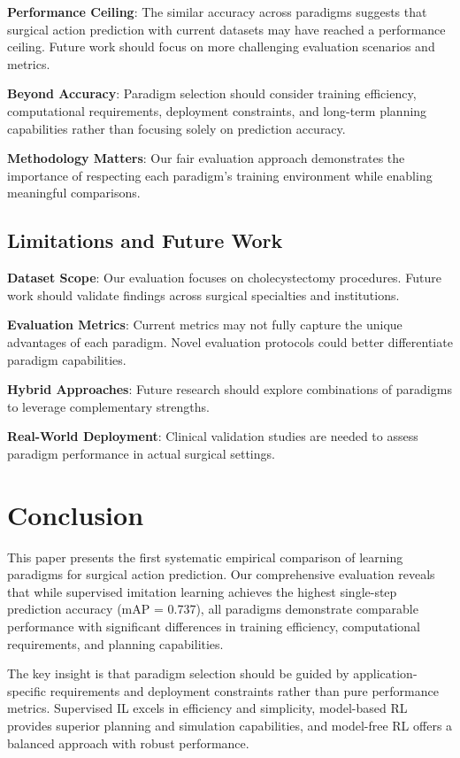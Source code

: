\documentclass[conference]{IEEEtran}
\begin{document}
\textbf{Performance Ceiling}: The similar accuracy across paradigms suggests that surgical action prediction with current datasets may have reached a performance ceiling. Future work should focus on more challenging evaluation scenarios and metrics.

\textbf{Beyond Accuracy}: Paradigm selection should consider training efficiency, computational requirements, deployment constraints, and long-term planning capabilities rather than focusing solely on prediction accuracy.

\textbf{Methodology Matters}: Our fair evaluation approach demonstrates the importance of respecting each paradigm's training environment while enabling meaningful comparisons.

\subsection{Limitations and Future Work}

\textbf{Dataset Scope}: Our evaluation focuses on cholecystectomy procedures. Future work should validate findings across surgical specialties and institutions.

\textbf{Evaluation Metrics}: Current metrics may not fully capture the unique advantages of each paradigm. Novel evaluation protocols could better differentiate paradigm capabilities.

\textbf{Hybrid Approaches}: Future research should explore combinations of paradigms to leverage complementary strengths.

\textbf{Real-World Deployment}: Clinical validation studies are needed to assess paradigm performance in actual surgical settings.

\section{Conclusion}

This paper presents the first systematic empirical comparison of learning paradigms for surgical action prediction. Our comprehensive evaluation reveals that while supervised imitation learning achieves the highest single-step prediction accuracy (mAP = 0.737), all paradigms demonstrate comparable performance with significant differences in training efficiency, computational requirements, and planning capabilities.

The key insight is that paradigm selection should be guided by application-specific requirements and deployment constraints rather than pure performance metrics. Supervised IL excels in efficiency and simplicity, model-based RL provides superior planning and simulation capabilities, and model-free RL offers a balanced approach with robust performance.
\end{document}
